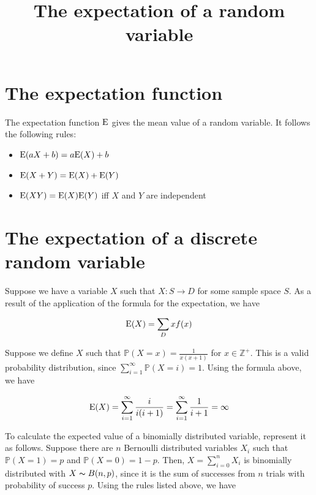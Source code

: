 

\title{The expectation of a random variable}
\maketitle

\section{The expectation function}
The expectation function $\mathrm{E}$ gives the mean value of a random variable. It follows the following rules:

\begin{itemize}
  \item $\mathrm{E}(aX + b) = a\mathrm{E}(X) + b$
  \item $\mathrm{E}(X + Y) = \mathrm{E}(X) + \mathrm{E}(Y)$
  \item $\mathrm{E}(XY) = \mathrm{E}(X)\mathrm{E}(Y)$ iff $X$ and $Y$ are independent
\end{itemize}

\section{The expectation of a discrete random variable}
Suppose we have a variable $X$ such that $X: S \rightarrow D$ for some sample space $S$. As a result of the application of the formula for the expectation, we have

\begin{align*}
  \mathrm{E}(X) = \sum_D x f(x)
\end{align*}

\ex
Suppose we define $X$ such that $\mathbb{P}(X = x) = \frac{1}{x(x + 1)}$ for $x \in \mathbb{Z}^+$. This is a valid probability distribution, since $\sum_{i = 1}^{\infty} \mathbb{P}(X = i) = 1$. Using the formula above, we have

\begin{align*}
  \mathrm{E}(X) = \sum_{i = 1}^{\infty} \frac{i}{i(i + 1)} = \sum_{i = 1}^{\infty} \frac{1}{i + 1} = \infty
\end{align*}

\ex
To calculate the expected value of a binomially distributed variable, represent it as follows. Suppose there are $n$ Bernoulli distributed variables $X_i$ such that $\mathbb{P}(X = 1) = p$ and $\mathbb{P}(X = 0) = 1 - p$. Then, $X = \sum_{i = 0}^n X_i$ is binomially distributed with $X \thicksim B(n, p)$, since it is the sum of successes from $n$ trials with probability of success $p$. Using the rules listed above, we have

